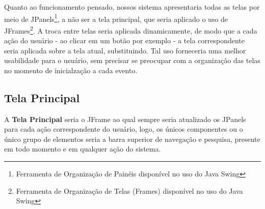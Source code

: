 \documentclass[a4paper,12pt]{article}
\begin{document}
Quanto ao funcionamento pensado, nossos sistema apresentaria todas as telas por meio de JPanels\footnote{
	Ferramenta de Organização de Painéis disponível no uso do Java Swing
}, a não ser a tela principal, que seria aplicado o uso de JFrames\footnote{
	Ferramenta de Organização de Telas (Frames) disponível no uso do Java Swing
}. A troca entre telas seria aplicada dinamicamente, de modo que a cada ação do usuário - ao clicar em um botão por exemplo - a tela correspondente seria aplicada sobre a tela atual, substituindo. Tal uso forneceria uma melhor usabilidade para o usuário, sem precisar se preocupar com a organização das telas no momento de inicialzação a cada evento.

\subsection{Tela Principal}
A \textbf{Tela Principal} seria o JFrame ao qual sempre seria atualizado os JPanels para cada ação correspondente do usuário, logo, os únicos componentes ou o único grupo de elementos seria a barra superior de navegação e pesquisa, presente em todo momento e em qualquer ação do sistema.
\end{document}
